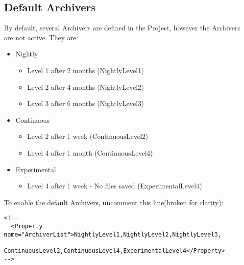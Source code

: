 \documentclass{InsightBook}
\begin{document}
\subsection{Default Archivers}
By default, several Archivers are defined in the Project, however the
Archivers are not active.  They are:
\begin{itemize}
           \item Nightly {
\begin{itemize}
\item Level 1 after 2 months (NightlyLevel1)
\item Level 2 after 4 months (NightlyLevel2)
\item Level 3 after 6 months (NightlyLevel3)
\end{itemize}
}
           \item Continuous {
\begin{itemize}
\item Level 2 after 1 week (ContinuousLevel2)
\item Level 4 after 1 month (ContinuousLevel4)
\end{itemize}
}
           \item Experimental {
\begin{itemize}
\item Level 4 after 1 week - No files saved (ExperimentalLevel4)
\end{itemize}
}
\end{itemize}

To enable the default Archivers, uncomment this line(broken for clarity):
\begin{verbatim}
<!--
  <Property name="ArchiverList">NightlyLevel1,NightlyLevel2,NightlyLevel3,
        ContinuousLevel2,ContinuousLevel4,ExperimentalLevel4</Property>
-->
\end{verbatim}
\end{document}
